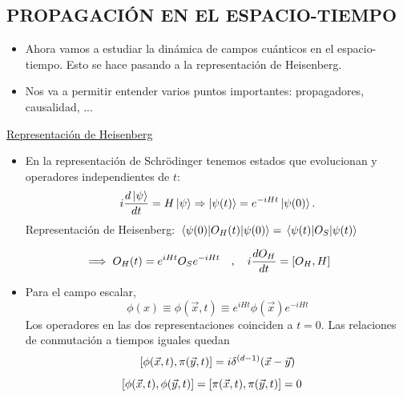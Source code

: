 \vspace{0.5cm}
\subsection{PROPAGACIÓN EN EL ESPACIO-TIEMPO}
\begin{itemize}
    \item Ahora vamos a estudiar la dinámica de campos cuánticos en el espacio-tiempo. Esto se hace pasando a la representación de Heisenberg.
    \item Nos va a permitir entender varios puntos importantes: propagadores, causalidad, ...
\end{itemize}

\noindent \underline{Representación de Heisenberg}
\begin{itemize}
    \item En la representación de Schrödinger tenemos estados que evolucionan y operadores independientes de $t$:
          $$ i \frac{d\ket{\psi}}{dt} = H \ket{\psi} \Rightarrow \ket{\psi(t)} = e^{-iHt} \ket{\psi(0)} . $$
          Representación de Heisenberg: $\matrixel{\psi(0)}{O_H(t)}{\psi(0)} = \matrixel{\psi(t)}{O_S}{\psi(t)}$
\end{itemize}
$$\implies O_H(t) = e^{iHt} O_S e^{-iHt} \quad , \quad i \frac{dO_H}{dt} = \comm{O_H}{H} $$

\begin{itemize}
    \item Para el campo escalar,
          $$ \phi(x) \equiv \phi(\vec{x},t) \equiv e^{iHt} \phi(\vec{x}) e^{-iHt} $$
          Los operadores en las dos representaciones coinciden a $t=0$. Las relaciones de conmutación a tiempos iguales quedan
          $$ \comm{\phi(\vec{x},t)}{\pi(\vec{y},t)} = i \delta^{(d-1)}(\vec{x}-\vec{y}) $$
          $$ \comm{\phi(\vec{x},t)}{\phi(\vec{y},t)} = \comm{\pi(\vec{x},t)}{\pi(\vec{y},t)} = 0 \quad$$
\end{itemize}

